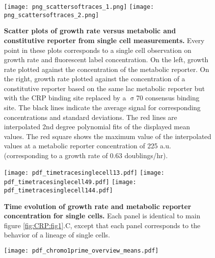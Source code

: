 \begin{figure}%
	\centering
	\texttt{[image: png\_scattersoftraces\_1.png]}
	\texttt{[image: png\_scattersoftraces\_2.png]}	
	\caption{ 
		\textbf{Scatter plots of growth rate versus metabolic and constitutive reporter from single cell measurements.}
		Every point in these plots corresponds to a single cell observation on growth rate and fluorescent label concentration.
		On the left, growth rate plotted against the concentration of the metabolic reporter.
		On the right, growth rate plotted against the concentration of a constitutive reporter based on the same lac metabolic reporter but with the CRP binding site replaced by a $\upsigma$70 consensus binding site.
		The black lines indicate the average signal for corresponding concentrations and standard deviations.
		The red lines are interpolated 2nd degree polynomial fits of the displayed mean values.
		The red square shows the maximum value of the interpolated values at a metabolic reporter concentration of 225 a.u. (corresponding to a growth rate of 0.63 doublings/hr).
	}
	\label{fig:CRP:scatterspulsing}
\end{figure}%


\begin{figure}%
	\centering
	\texttt{[image: pdf\_timetracesinglecell13.pdf]}
	\texttt{[image: pdf\_timetracesinglecell49.pdf]}
	\texttt{[image: pdf\_timetracesinglecell144.pdf]}
	\label{fig:CRP:timevolutionCRPgrowthsinglecell}
    \caption{    
	\textbf{Time evolution of growth rate and metabolic reporter concentration for single cells.}
	Each panel is identical to main figure \ref{fig:CRP:fig1}.C, except that each panel corresponds to the behavior of a lineage of single cells.
}
\end{figure}%



\begin{figure}
	\centering
	\texttt{[image: pdf\_chromo1prime\_overview\_means.pdf]}
	\clearpage %
\end{figure}	

